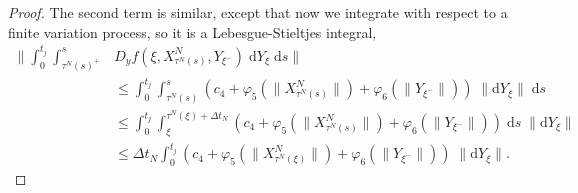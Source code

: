 \documentclass[reqno,12pt]{amsart}
\theoremstyle{plain} %
\theoremstyle{definition} %
\begin{document}
\begin{proof}
    The second term is similar, except that now we integrate with respect to a finite variation process, so it is a Lebesgue-Stieltjes integral,
    \begin{equation}
        \label{ordercadlagfvterm2}
        \begin{aligned}
            \bigg\|\int_0^{t_j} \int_{\tau^N(s)^+}^s & D_y f(\xi, X_{\tau^N(s)}^N, Y_{\xi^-}) \;\mathrm{d}Y_\xi\;\mathrm{d}s\bigg\| \\
            & \leq \int_0^{t_j} \int_{\tau^N(s)}^s \left(c_4 + \varphi_5 (\|X_{\tau^N(s)}^N\|) + \varphi_6(\|Y_{\xi^-}\|)\right)\;\|\mathrm{d}Y_\xi\|\;\mathrm{d}s \\
            & \leq \int_0^{t_j} \int_{\xi}^{\tau^N(\xi) + \Delta t_N} \left(c_4 + \varphi_5(\|X_{\tau^N(s)}^N\|) + \varphi_6(\|Y_{\xi^-}\|)\right)\;\mathrm{d}s\;\|\mathrm{d}Y_\xi\| \\
            & \leq \Delta t_N\int_0^{t_j} \left(c_4 + \varphi_5(\|X_{\tau^N(\xi)}^N\|) + \varphi_6(\|Y_{\xi^-}\|)\right)\;\|\mathrm{d}Y_\xi\|.
        \end{aligned}
    \end{equation}


\end{proof}
\end{document}
